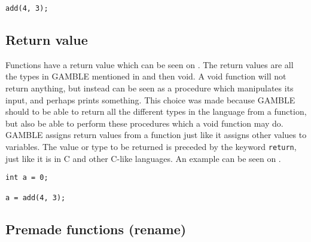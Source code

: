 \begin{lstlisting}[caption={Function Idemtifier},label={lst:functionCall}]
add(4, 3);
\end{lstlisting}


\subsection{Return value}
Functions have a return value which can be seen on .
The return values are all the types in GAMBLE mentioned in  and then void. 
A void function will not return anything, but instead can be seen as a procedure which manipulates its input, and perhaps prints something.
This choice was made because GAMBLE should to be able to return all the different types in the language from a function, but also be able to perform these procedures which a void function may do.
GAMBLE assigns return values from a function just like it assigns other values to variables.
The value or type to be returned is preceded by the keyword \texttt{return}, just like it is in C and other C-like languages.
An example can be seen on .

\begin{lstlisting}[caption={Function Idemtifier},label={lst:returnFunction}]
int a = 0;

a = add(4, 3);
\end{lstlisting}

\subsection{Premade functions (rename)} 

%


